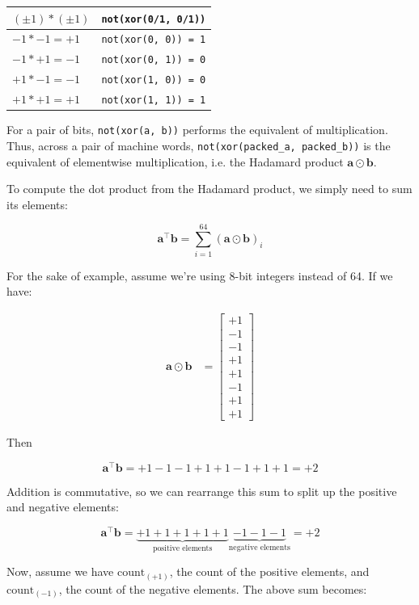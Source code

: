 \documentclass[12pt]{article}
\newcommand{\av}[0]{\mathbf{a}}
\newcommand{\bv}[0]{\mathbf{b}}
\newcommand{\transpose}[1]{#1 ^\top}
\newcommand{\dotp}[2]{\transpose{#1} #2}
\newcommand{\hadamard}[0]{\odot}
\begin{document}
\begin{center}
\begin{tabular}{ll}
\((\pm 1) * (\pm 1)\) & \texttt{not(xor(0/1, 0/1))}\\
\hline
\(-1 * -1 = +1\) & \texttt{not(xor(0, 0)) = 1}\\
\(-1 * +1 = -1\) & \texttt{not(xor(0, 1)) = 0}\\
\(+1 * -1 = -1\) & \texttt{not(xor(1, 0)) = 0}\\
\(+1 * +1 = +1\) & \texttt{not(xor(1, 1)) = 1}\\
\end{tabular}
\end{center}

For a pair of bits, \texttt{not(xor(a, b))} performs the equivalent of multiplication.
Thus, across a pair of machine words, \texttt{not(xor(packed\_a, packed\_b))} is the equivalent of elementwise multiplication, i.e. the Hadamard product \(\av \odot \bv\).

To compute the dot product from the Hadamard product, we simply need to sum its elements:

$$\dotp{\av}{\bv} = \sum_{i=1}^{64} (\av \odot \bv)_i$$

For the sake of example, assume we're using 8-bit integers instead of 64. If we have:

\begin{align*}
  \av \hadamard \bv &= \begin{bmatrix}
      +1\\-1\\-1\\+1\\+1\\-1\\+1\\+1
       \end{bmatrix}
\end{align*}

Then

$$\dotp{\av}{\bv} = +1 -1 -1 +1 +1 -1 +1 +1 = +2$$

Addition is commutative, so we can rearrange this sum to split up the positive and negative elements:

$$\dotp{\av}{\bv} = \underbrace{+1 +1 +1 +1 +1}_{\text{positive elements}}
\underbrace{-1 -1 -1}_{\text{negative elements}} = +2$$

Now, assume we have \(\mathrm{count}_{(+1)}\), the count of the positive elements, and \(\mathrm{count}_{(-1)}\), the count of the negative elements. The above sum becomes:
\end{document}
